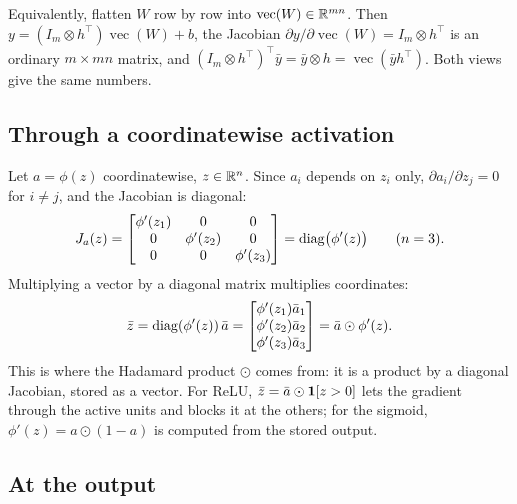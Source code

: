 \begin{notechapter}
\begin{remark}[Flattening]
Equivalently, flatten $W$ row by row into $\operatorname{vec}(W)\in\mathbb{R}^{mn}$. Then $y = (I_m\otimes h^\top)\operatorname{vec}(W) + b$, the
Jacobian $\partial y/\partial\operatorname{vec}(W) = I_m\otimes h^\top$ is an ordinary $m\times mn$ matrix, and
$(I_m\otimes h^\top)^\top\bar y = \bar y\otimes h = \operatorname{vec}(\bar yh^\top)$. Both views give the same numbers.
\end{remark}

\subsection{Through a coordinatewise activation}\label{backpropagation:sec:activation}

Let $a = \phi(z)$ coordinatewise, $z\in\mathbb{R}^n$. Since $a_i$ depends on $z_i$ only, $\partial a_i/\partial z_j = 0$ for $i\neq j$, and
the Jacobian is diagonal:
\[
  J_a(z) = \begin{bmatrix}\phi'(z_1) & 0 & 0\\ 0 & \phi'(z_2) & 0\\ 0 & 0 & \phi'(z_3)\end{bmatrix} = \operatorname{diag}\bigl(\phi'(z)\bigr)\qquad(n = 3).
\]
Multiplying a vector by a diagonal matrix multiplies coordinates:
\[
  \bar z = \operatorname{diag}(\phi'(z))\,\bar a = \begin{bmatrix}\phi'(z_1)\bar a_1\\ \phi'(z_2)\bar a_2\\ \phi'(z_3)\bar a_3\end{bmatrix}
  = \bar a\odot\phi'(z) .
\]
This is where the Hadamard product $\odot$ comes from: it is a product by a diagonal Jacobian,
stored as a vector. For ReLU, $\bar z = \bar a\odot\mathbf{1}[z>0]$ lets the gradient through the active units and
blocks it at the others; for the sigmoid, $\phi'(z) = a\odot(1 - a)$ is computed from the stored output.

\subsection{At the output}\label{backpropagation:sec:output}


\end{notechapter}
